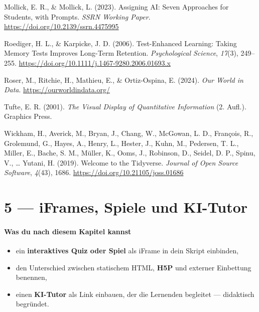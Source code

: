 \documentclass[
  ngerman,
  a4paper,
  DIV=11]{scrreprt}
\newlength{\cslhangindent}
\newenvironment{CSLReferences}[2] %
 {\begin{list}{}{%
  \setlength{\itemindent}{0pt}
  \setlength{\leftmargin}{0pt}
  \setlength{\parsep}{0pt}
  \ifodd #1
   \setlength{\leftmargin}{\cslhangindent}
   \setlength{\itemindent}{-1\cslhangindent}
  \fi
  \setlength{\itemsep}{#2\baselineskip}}}
 {\end{list}}
\providecommand{\tightlist}{%
  \setlength{\itemsep}{0pt}\setlength{\parskip}{0pt}}
\begin{document}
\begin{CSLReferences}{1}{0}
Mollick, E. R., \& Mollick, L. (2023). Assigning {AI}: Seven Approaches
for Students, with Prompts. \emph{SSRN Working Paper}.
\url{https://doi.org/10.2139/ssrn.4475995}

Roediger, H. L., \& Karpicke, J. D. (2006). Test-Enhanced Learning:
Taking Memory Tests Improves Long-Term Retention. \emph{Psychological
Science}, \emph{17}(3), 249--255.
\url{https://doi.org/10.1111/j.1467-9280.2006.01693.x}

Roser, M., Ritchie, H., Mathieu, E., \& Ortiz-Ospina, E. (2024).
\emph{Our World in Data}. \url{https://ourworldindata.org/}

Tufte, E. R. (2001). \emph{The Visual Display of Quantitative
Information} (2. Aufl.). Graphics Press.

Wickham, H., Averick, M., Bryan, J., Chang, W., McGowan, L. D.,
François, R., Grolemund, G., Hayes, A., Henry, L., Hester, J., Kuhn, M.,
Pedersen, T. L., Miller, E., Bache, S. M., Müller, K., Ooms, J.,
Robinson, D., Seidel, D. P., Spinu, V., \ldots{} Yutani, H. (2019).
Welcome to the Tidyverse. \emph{Journal of Open Source Software},
\emph{4}(43), 1686. \url{https://doi.org/10.21105/joss.01686}

\end{CSLReferences}

\chapter{5 --- iFrames, Spiele und
KI-Tutor}\label{iframes-spiele-und-ki-tutor}

\subsubsection{Was du nach diesem Kapitel
kannst}\label{was-du-nach-diesem-kapitel-kannst-5}

\begin{itemize}
\tightlist
\item
  ein \textbf{interaktives Quiz oder Spiel} als iFrame in dein Skript
  einbinden,
\item
  den Unterschied zwischen statischem HTML, \textbf{H5P} und externer
  Einbettung benennen,
\item
  einen \textbf{KI-Tutor} als Link einbauen, der die Lernenden begleitet
  --- didaktisch begründet.
\end{itemize}
\end{document}
